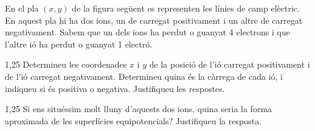 En el pla $(x, y)$ de la figura següent es representen les línies de camp elèctric. En aquest pla hi ha dos ions, un de carregat positivament i un altre de carregat negativament. Sabem que un dels ions ha perdut o guanyat 4 electrons i que l'altre ió ha perdut o guanyat 1 electró.

\begin{apartat}{1,25}
Determineu les coordenades $x$ i $y$ de la posició de l'ió carregat positivament i de l'ió carregat negativament. Determineu quina és la càrrega de cada ió, i indiqueu si és positiva o negativa. Justifiqueu les respostes.
\end{apartat}

\begin{apartat}{1,25}
Si ens situéssim molt lluny d'aquests dos ions, quina seria la forma aproximada de les superfícies equipotencials? Justifiqueu la resposta.
\end{apartat}

